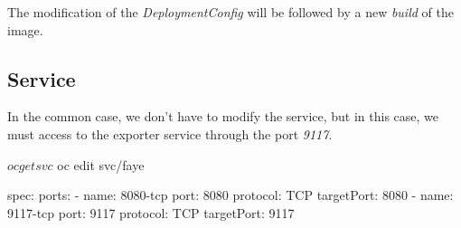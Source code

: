 The modification of the \emph{DeploymentConfig} will be followed by a  new \emph{build} of the image.

\subsection{Service}

In the common case, we don't have to modify the service, but in this case, we must access to the exporter service through the port \emph{9117}. 
\begin{bashcode}
  $ oc getsvc
  $ oc edit svc/faye
\end{bashcode}

\begin{yamlcode}
spec:
  ports:
    - name: 8080-tcp
      port: 8080
      protocol: TCP
      targetPort: 8080
    - name: 9117-tcp
      port: 9117
      protocol: TCP
      targetPort: 9117
\end{yamlcode}